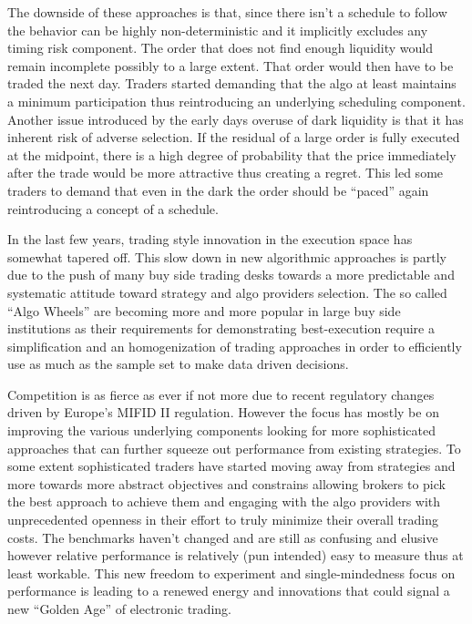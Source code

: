 The downside of these approaches is that, since there isn't a schedule to follow the behavior can be highly non-deterministic and it implicitly excludes any timing risk component. The order that does not find enough liquidity would remain incomplete possibly to a large extent. That order would then have to be traded the next day. Traders started demanding that the algo at least maintains a minimum participation thus reintroducing an underlying scheduling component. Another issue introduced by the early days overuse of dark liquidity is that it has inherent risk of adverse selection. If the residual of a large order is fully executed at the midpoint, there is a high degree of probability that the price immediately after the trade would be more attractive thus creating a regret. This led some traders to demand that even in the dark the order should be ``paced'' again reintroducing a concept of a schedule.

In the last few years, trading style innovation in the execution space has somewhat tapered off. This slow down in new algorithmic approaches is partly due to the push of many buy side trading desks towards a more predictable and systematic attitude toward strategy and algo providers selection. The so called ``Algo Wheels'' are becoming more and more popular in large buy side institutions as their requirements for demonstrating best-execution require a simplification and an homogenization of trading approaches in order to  efficiently use as much as the sample set to make data driven decisions. 

Competition is as fierce as ever if not more due to recent regulatory changes driven by Europe's MIFID II regulation.  However the focus has mostly be on improving the various underlying components looking for more sophisticated approaches that can further squeeze out performance from existing strategies. To some extent sophisticated traders have started moving away from strategies and more towards more abstract objectives and constrains allowing brokers to pick the best approach to achieve them and engaging with the algo providers with unprecedented openness in their effort to truly minimize their overall trading costs. The benchmarks haven't changed and are still as confusing and elusive however relative performance is relatively (pun intended) easy to measure thus at least workable. This new freedom to experiment and single-mindedness focus on performance is leading to a renewed energy and innovations that could signal a new ``Golden Age'' of electronic trading.

